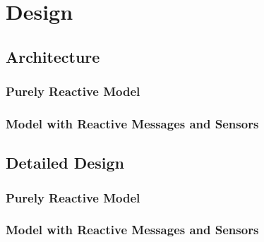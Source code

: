 \chapter{Design}
\label{chap:design}

\section{Architecture}

\subsection{Purely Reactive Model}

\subsection{Model with Reactive Messages and Sensors}

\section{Detailed Design}

\subsection{Purely Reactive Model}

\subsection{Model with Reactive Messages and Sensors}